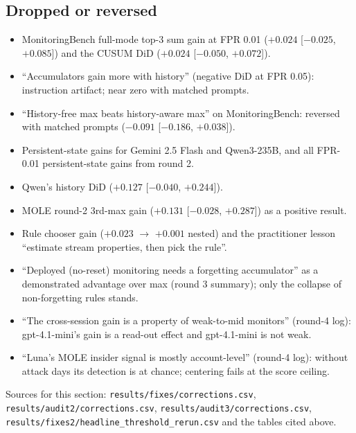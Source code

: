 \documentclass[11pt]{article}
\newcommand{\m}{\ensuremath{-}}
\begin{document}
\subsection*{Dropped or reversed}
\begin{itemize}
\item MonitoringBench full-mode top-3 sum gain at FPR 0.01 ($+0.024$ [$\m0.025$, $+0.085$]) and the CUSUM DiD ($+0.024$ [$\m0.050$, $+0.072$]).
\item ``Accumulators gain more with history'' (negative DiD at FPR 0.05): instruction artifact; near zero with matched prompts.
\item ``History-free max beats history-aware max'' on MonitoringBench: reversed with matched prompts ($\m0.091$ [$\m0.186$, $+0.038$]).
\item Persistent-state gains for Gemini 2.5 Flash and Qwen3-235B, and all FPR-0.01 persistent-state gains from round 2.
\item Qwen's history DiD ($+0.127$ [$\m0.040$, $+0.244$]).
\item MOLE round-2 3rd-max gain ($+0.131$ [$\m0.028$, $+0.287$]) as a positive result.
\item Rule chooser gain ($+0.023$ $\to$ $+0.001$ nested) and the practitioner lesson ``estimate stream properties, then pick the rule''.
\item ``Deployed (no-reset) monitoring needs a forgetting accumulator'' as a demonstrated advantage over max (round 3 summary); only the collapse of non-forgetting rules stands.
\item ``The cross-session gain is a property of weak-to-mid monitors'' (round-4 log): gpt-4.1-mini's gain is a read-out effect and gpt-4.1-mini is not weak.
\item ``Luna's MOLE insider signal is mostly account-level'' (round-4 log): without attack days its detection is at chance; centering fails at the score ceiling.
\end{itemize}
Sources for this section: \nolinkurl{results/fixes/corrections.csv}, \nolinkurl{results/audit2/corrections.csv}, \nolinkurl{results/audit3/corrections.csv}, \nolinkurl{results/fixes2/headline_threshold_rerun.csv} and the tables cited above.
\end{document}
